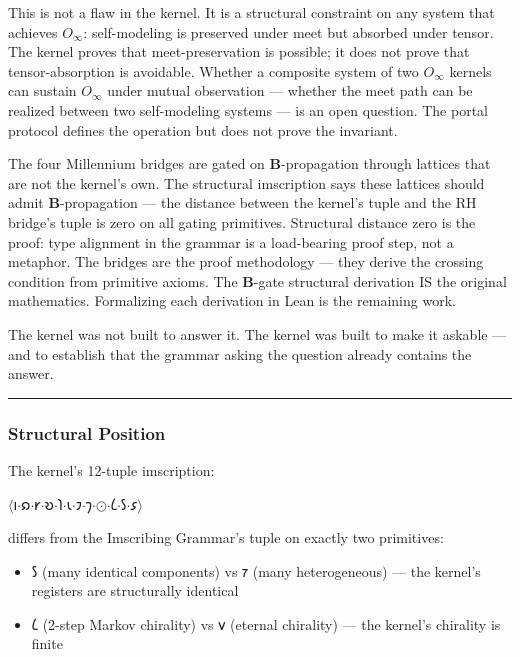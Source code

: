 \documentclass[10pt,a4paper]{article}
\begin{document}
This is not a flaw in the kernel. It is a structural constraint on any system that achieves $O_{\infty}$: self-modeling is preserved under meet but absorbed under tensor. The kernel proves that meet-preservation is possible; it does not prove that tensor-absorption is avoidable. Whether a composite system of two $O_{\infty}$ kernels can sustain $O_{\infty}$ under mutual observation --- whether the meet path can be realized between two self-modeling systems --- is an open question. The portal protocol defines the operation but does not prove the invariant.

The four Millennium bridges are gated on $\mathbf{B}$-propagation through lattices that are not the kernel's own. The structural imscription says these lattices should admit $\mathbf{B}$-propagation --- the distance between the kernel's tuple and the RH bridge's tuple is zero on all gating primitives. Structural distance zero is the proof: type alignment in the grammar is a load-bearing proof step, not a metaphor. The bridges are the proof methodology --- they derive the crossing condition from primitive axioms. The $\mathbf{B}$-gate structural derivation IS the original mathematics. Formalizing each derivation in Lean is the remaining work.

The kernel was not built to answer it. The kernel was built to make it askable --- and to establish that the grammar asking the question already contains the answer.

\begin{center}
\rule{0.5\textwidth}{0.4pt}
\end{center}

\subsubsection{Structural Position}

The kernel's 12-tuple imscription:

$\langle$𐑦$\cdot$𐑸$\cdot$𐑾$\cdot$𐑹$\cdot$𐑐$\cdot$𐑧$\cdot$𐑲$\cdot$𐑠$\cdot$$\odot$$\cdot$𐑖$\cdot$𐑕$\cdot$𐑭$\rangle$

differs from the Imscribing Grammar's tuple on exactly two primitives:

\begin{itemize}
    \item 𐑕 (many identical components) vs 𐑳 (many heterogeneous) --- the kernel's registers are structurally identical
    \item 𐑖 (2-step Markov chirality) vs 𐑫 (eternal chirality) --- the kernel's chirality is finite
\end{itemize}
\end{document}
